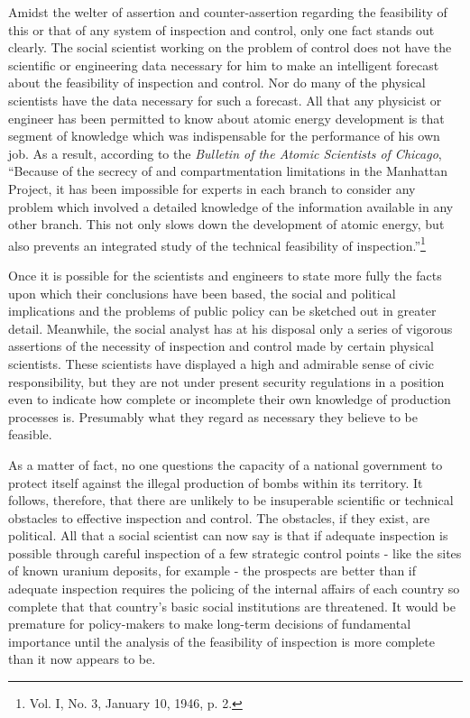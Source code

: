 \label{V-narco2}

Amidst the welter of assertion and counter-assertion regarding the feasibility of this or that of any system of inspection and control, only one fact stands out clearly. The social scientist working on the problem of control does not have the scientific or engineering data necessary for him to make an intelligent forecast about the feasibility of inspection and control. Nor do many of the physical scientists have the data necessary for such a forecast. All that any physicist or engineer has been permitted to know about atomic energy development is that segment of knowledge which was indispensable for the performance of his own job. As a result, according to the \emph{Bulletin of the Atomic Scientists of Chicago}, ``Because of the secrecy of and compartmentation limitations in the Manhattan Project, it has been impossible for experts in each branch to consider any problem which involved a detailed knowledge of the information available in any other branch. This not only slows down the development of atomic energy, but also prevents an integrated study of the technical feasibility of inspection.''\footnote{Vol. I, No. 3, January 10, 1946, p. 2.}

Once it is possible for the scientists and engineers to state more fully the facts upon which their conclusions have been based, the social and political implications and the problems of public policy can be sketched out in greater detail. Meanwhile, the social analyst has at his disposal only a series of vigorous assertions of the necessity of inspection and control made by certain physical scientists. These scientists have displayed a high and admirable sense of civic responsibility, but they are not under present security regulations in a position even to indicate how complete or incomplete their own knowledge of production processes is. Presumably what they regard as necessary they believe to be feasible.

As a matter of fact, no one questions the capacity of a national government to protect itself against the illegal production of bombs within its territory. It follows, therefore, that there are unlikely to be insuperable scientific or technical obstacles to effective inspection and control. The obstacles, if they exist, are political. All that a social scientist can now say is that if adequate inspection is possible through careful inspection of a few strategic control points - like the sites of known uranium deposits, for example - the prospects are better than if adequate inspection requires the policing of the internal affairs of each country so complete that that country's basic social institutions are threatened. It would be premature for policy-makers to make long-term decisions of fundamental importance until the analysis of the feasibility of inspection is more complete than it now appears to be.

